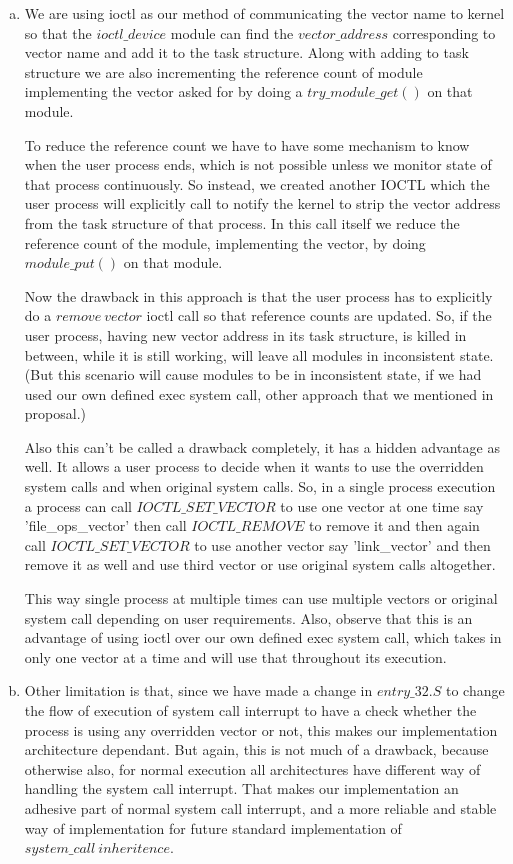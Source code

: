\documentclass[11pt]{article}
\begin{document}
\begin{enumerate}[(a)]
\item
We are using ioctl as our method of communicating the vector name to kernel so that the $ioctl\_device$ module can find the $vector\_address$ corresponding to vector name and add it to the task structure. Along with adding to task structure we are also incrementing the reference count of module implementing the vector asked for by doing a $try\_module\_get()$ on that module.

To reduce the reference count we have to have some mechanism to know when the user process ends, which is not possible unless we monitor state of that process continuously. So instead, we created another IOCTL which the user process will explicitly call to notify the kernel to strip the vector address from the task structure of that process. In this call itself we reduce the reference count of the module, implementing the vector, by doing $module\_put()$ on that module. 

Now the drawback in this approach is that the user process has to explicitly do a $remove\ vector$ ioctl call so that reference counts are updated. So, if the user process, having new vector address in its task structure, is killed in between, while it is still working, will leave all modules in inconsistent state. (But this scenario will cause modules to be in inconsistent state, if we had used our own defined exec system call, other approach that we mentioned in proposal.)

Also this can't be called a drawback completely, it has a hidden advantage as well. It allows a user process to decide when it wants to use the overridden system calls and when original system calls. So, in a single process execution a process can call $IOCTL\_SET\_VECTOR$ to use one vector at one time say 'file\_ops\_vector' then call $IOCTL\_REMOVE$ to remove it and then again call $IOCTL\_SET\_VECTOR$ to use another vector say 'link\_vector' and then remove it as well and use third vector or use original system calls altogether. 

This way single process at multiple times can use multiple vectors or original system call depending on user requirements. Also, observe that this is an advantage of using ioctl over our own defined exec system call, which takes in only one vector at a time and will use that throughout its execution.


\item
Other limitation is that, since we have made a change in $entry\_32.S$ to change the flow of execution of system call interrupt to have a check whether the process is using any overridden vector or not, this makes our implementation architecture dependant. But again, this is not much of a drawback, because otherwise also, for normal execution all architectures have different way of handling the system call interrupt. That makes our implementation an adhesive part of normal system call interrupt, and a more reliable and stable way of implementation for future standard implementation of $system\_call\ inheritence$.


\end{enumerate}
\end{document}
